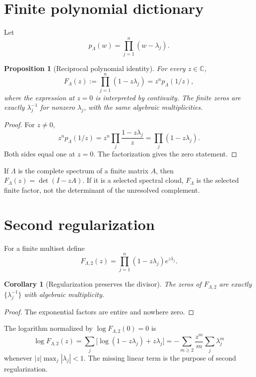\documentclass[11pt]{article}
\newtheorem{proposition}[theorem]{Proposition}
\newtheorem{corollary}[theorem]{Corollary}
\theoremstyle{remark}\newtheorem{remark}[theorem]{Remark}
\newcommand{\Det}{\operatorname{det}}
\begin{document}
\section{Finite polynomial dictionary}

Let
\begin{equation}
 p_\Lambda(w)=\prod_{j=1}^n(w-\lambda_j).
\end{equation}

\begin{proposition}[Reciprocal polynomial identity]\label{prop:identity}
For every $z\in\mathbb C$,
\begin{equation}\label{eq:identity}
 F_\Lambda(z):=\prod_{j=1}^n(1-z\lambda_j)
 =z^n p_\Lambda(1/z),
\end{equation}
where the expression at $z=0$ is interpreted by continuity.
The finite zeros are exactly $\lambda_j^{-1}$ for nonzero $\lambda_j$, with
the same algebraic multiplicities.
\end{proposition}
\begin{proof}
For $z\ne0$,
\[
 z^n p_\Lambda(1/z)
 =z^n\prod_j\frac{1-z\lambda_j}{z}
 =\prod_j(1-z\lambda_j).
\]
Both sides equal one at $z=0$. The factorization gives the zero statement.
\end{proof}

If $\Lambda$ is the complete spectrum of a finite matrix $A$, then
$F_\Lambda(z)=\Det(I-zA)$. If it is a selected spectral cloud, $F_\Lambda$
is the selected finite factor, not the determinant of the unresolved
complement.

\section{Second regularization}

For a finite multiset define
\begin{equation}\label{eq:det2}
 F_{\Lambda,2}(z)=
 \prod_{j=1}^n(1-z\lambda_j)e^{z\lambda_j}.
\end{equation}

\begin{corollary}[Regularization preserves the divisor]\label{cor:zeros}
The zeros of $F_{\Lambda,2}$ are exactly
$\{\lambda_j^{-1}\}$ with algebraic multiplicity.
\end{corollary}
\begin{proof}
The exponential factors are entire and nowhere zero.
\end{proof}

The logarithm normalized by $\log F_{\Lambda,2}(0)=0$ is
\begin{equation}\label{eq:log}
 \log F_{\Lambda,2}(z)
 =\sum_j\bigl[\log(1-z\lambda_j)+z\lambda_j\bigr]
 =-\sum_{m\ge2}\frac{z^m}{m}\sum_j\lambda_j^m
\end{equation}
whenever $|z|\max_j|\lambda_j|<1$. The missing linear term is the purpose of
second regularization.
\end{document}

